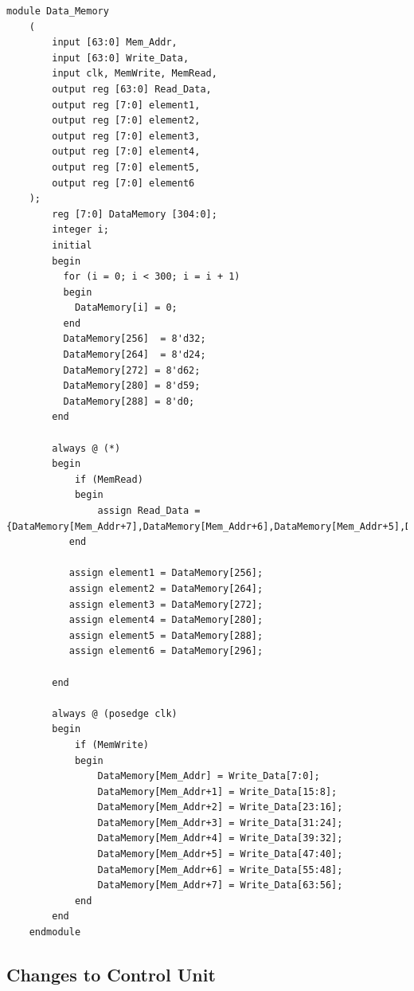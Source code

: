 \documentclass{article}
\begin{document}
\begin{lstlisting}[caption={Changes to Data Memory}, captionpos=b, language=RISC-V]
    module Data_Memory
    (
        input [63:0] Mem_Addr,
        input [63:0] Write_Data,
        input clk, MemWrite, MemRead,
        output reg [63:0] Read_Data,
        output reg [7:0] element1,
        output reg [7:0] element2,
        output reg [7:0] element3,
        output reg [7:0] element4,
        output reg [7:0] element5,
        output reg [7:0] element6
    );
        reg [7:0] DataMemory [304:0];
        integer i;
        initial
        begin 
          for (i = 0; i < 300; i = i + 1)
          begin 
            DataMemory[i] = 0;
          end
          DataMemory[256]  = 8'd32;
          DataMemory[264]  = 8'd24;
          DataMemory[272] = 8'd62;
          DataMemory[280] = 8'd59;
          DataMemory[288] = 8'd0;
        end 
        
        always @ (*)
        begin
            if (MemRead)
            begin
                assign Read_Data = {DataMemory[Mem_Addr+7],DataMemory[Mem_Addr+6],DataMemory[Mem_Addr+5],DataMemory[Mem_Addr+4],DataMemory[Mem_Addr+3],DataMemory[Mem_Addr+2],DataMemory[Mem_Addr+1],DataMemory[Mem_Addr]};
           end
           
           assign element1 = DataMemory[256];
           assign element2 = DataMemory[264];
           assign element3 = DataMemory[272];
           assign element4 = DataMemory[280];
           assign element5 = DataMemory[288];
           assign element6 = DataMemory[296];
           
        end
        
        always @ (posedge clk)
        begin
            if (MemWrite)
            begin
                DataMemory[Mem_Addr] = Write_Data[7:0];
                DataMemory[Mem_Addr+1] = Write_Data[15:8];
                DataMemory[Mem_Addr+2] = Write_Data[23:16];
                DataMemory[Mem_Addr+3] = Write_Data[31:24];
                DataMemory[Mem_Addr+4] = Write_Data[39:32];
                DataMemory[Mem_Addr+5] = Write_Data[47:40];
                DataMemory[Mem_Addr+6] = Write_Data[55:48];
                DataMemory[Mem_Addr+7] = Write_Data[63:56];
            end
        end
    endmodule
\end{lstlisting}


\subsection{Changes to Control Unit}
\end{document}
